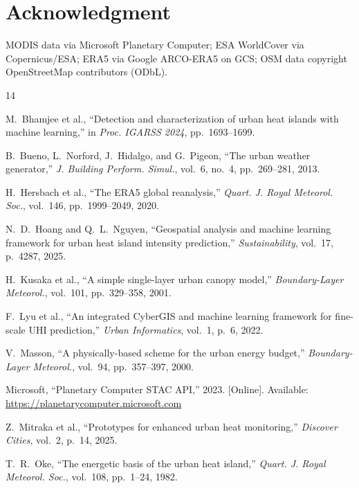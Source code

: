 \documentclass[conference]{IEEEtran}
\begin{document}
\section*{Acknowledgment}
MODIS data via Microsoft Planetary Computer; ESA WorldCover via Copernicus/ESA;
ERA5 via Google ARCO-ERA5 on GCS; OSM data copyright OpenStreetMap contributors (ODbL).


%   
\begin{thebibliography}{14}

M.~Bhamjee et al., ``Detection and characterization of urban heat islands
with machine learning,'' in \textit{Proc. IGARSS 2024}, pp.~1693--1699.

B.~Bueno, L.~Norford, J.~Hidalgo, and G.~Pigeon, ``The urban weather
generator,'' \textit{J. Building Perform. Simul.}, vol.~6, no.~4,
pp.~269--281, 2013.

H.~Hersbach et al., ``The ERA5 global reanalysis,''
\textit{Quart. J. Royal Meteorol. Soc.}, vol.~146, pp.~1999--2049, 2020.

N.~D.~Hoang and Q.~L.~Nguyen, ``Geospatial analysis and machine learning
framework for urban heat island intensity prediction,''
\textit{Sustainability}, vol.~17, p.~4287, 2025.

H.~Kusaka et al., ``A simple single-layer urban canopy model,''
\textit{Boundary-Layer Meteorol.}, vol.~101, pp.~329--358, 2001.

F.~Lyu et al., ``An integrated CyberGIS and machine learning framework for
fine-scale UHI prediction,'' \textit{Urban Informatics}, vol.~1, p.~6, 2022.

V.~Masson, ``A physically-based scheme for the urban energy budget,''
\textit{Boundary-Layer Meteorol.}, vol.~94, pp.~357--397, 2000.

Microsoft, ``Planetary Computer STAC API,'' 2023. [Online].
Available: \url{https://planetarycomputer.microsoft.com}

Z.~Mitraka et al., ``Prototypes for enhanced urban heat monitoring,''
\textit{Discover Cities}, vol.~2, p.~14, 2025.

T.~R.~Oke, ``The energetic basis of the urban heat island,''
\textit{Quart. J. Royal Meteorol. Soc.}, vol.~108, pp.~1--24, 1982.


\end{thebibliography}
\end{document}
